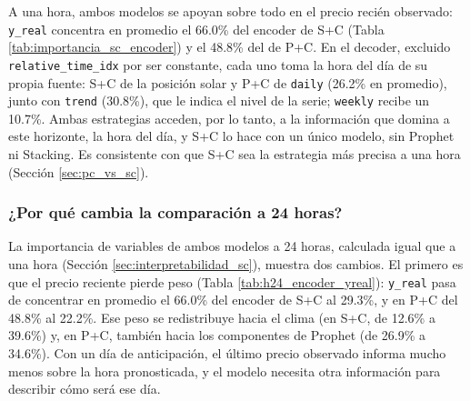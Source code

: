 A una hora, ambos modelos se apoyan sobre todo en el precio recién observado: \texttt{y\_real} concentra en promedio el 66.0\% del encoder de S+C (Tabla \ref{tab:importancia_sc_encoder}) y el 48.8\% del de P+C. En el decoder, excluido \texttt{relative\_time\_idx} por ser constante, cada uno toma la hora del día de su propia fuente: S+C de la posición solar y P+C de \texttt{daily} (26.2\% en promedio), junto con \texttt{trend} (30.8\%), que le indica el nivel de la serie; \texttt{weekly} recibe un 10.7\%. Ambas estrategias acceden, por lo tanto, a la información que domina a este horizonte, la hora del día, y S+C lo hace con un único modelo, sin Prophet ni Stacking. Es consistente con que S+C sea la estrategia más precisa a una hora (Sección \ref{sec:pc_vs_sc}).

\subsubsection{¿Por qué cambia la comparación a 24 horas?}
\label{sec:h24_porque}

La importancia de variables de ambos modelos a 24 horas, calculada igual que a una hora (Sección \ref{sec:interpretabilidad_sc}), muestra dos cambios. El primero es que el precio reciente pierde peso (Tabla \ref{tab:h24_encoder_yreal}): \texttt{y\_real} pasa de concentrar en promedio el 66.0\% del encoder de S+C al 29.3\%, y en P+C del 48.8\% al 22.2\%. Ese peso se redistribuye hacia el clima (en S+C, de 12.6\% a 39.6\%) y, en P+C, también hacia los componentes de Prophet (de 26.9\% a 34.6\%). Con un día de anticipación, el último precio observado informa mucho menos sobre la hora pronosticada, y el modelo necesita otra información para describir cómo será ese día.

